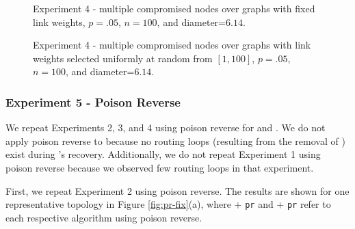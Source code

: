 \begin{figure*}[t]
\centering
{}
\caption{Experiment 4 - multiple compromised nodes over \er graphs with fixed link weights, $p=.05$, $n=100$, and diameter=$6.14$.}
\label{fig:many-fixed}
\end{figure*}



\begin{figure*}[t]
\centering
{}
\caption{Experiment 4 - multiple compromised nodes over \er graphs with link weights selected uniformly at random from $[1,100]$, $p=.05$, $n=100$, and diameter=$6.14$.}
\label{fig:many}
\end{figure*}

\subsubsection{Experiment 5 - Poison Reverse}
We repeat Experiments 2, 3, and 4 using poison reverse for \second and \cprs.  
We do not apply poison reverse to \purge because no routing loops (resulting from the removal of \bads)
exist during \purges's recovery. Additionally, we do not repeat Experiment 1 using poison reverse because we observed few routing loops in that experiment. 

First, we repeat Experiment 2 using poison reverse. The results are shown for one representative topology in Figure \ref{fig:pr-fix}(a),
where \second + {\tt pr} and \cpr + {\tt pr} refer to each respective algorithm
using poison reverse. %

